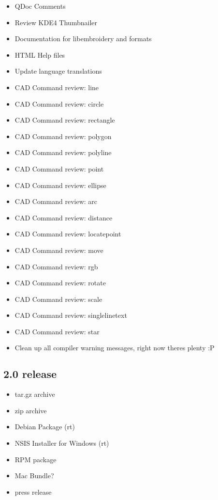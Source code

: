 \begin{itemize}
\item QDoc Comments
\item Review KDE4 Thumbnailer
\item Documentation for libembroidery and formats
\item HTML Help files
\item Update language translations
\item CAD Command review: line
\item CAD Command review: circle
\item CAD Command review: rectangle
\item CAD Command review: polygon
\item CAD Command review: polyline
\item CAD Command review: point
\item CAD Command review: ellipse
\item CAD Command review: arc
\item CAD Command review: distance
\item CAD Command review: locatepoint
\item CAD Command review: move
\item CAD Command review: rgb
\item CAD Command review: rotate
\item CAD Command review: scale
\item CAD Command review: singlelinetext
\item CAD Command review: star
\item Clean up all compiler warning messages, right now theres plenty :P
\end{itemize}

\subsection{2.0 release}

\begin{itemize}
\item tar.gz archive
\item zip archive
\item Debian Package (rt)
\item NSIS Installer for Windows (rt)
\item RPM package
\item Mac Bundle?
\item press release
\end{itemize}


